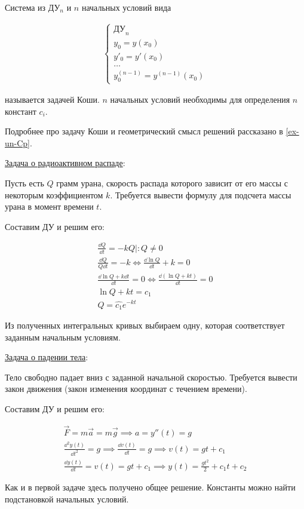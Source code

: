 \begin{definition}
  Система из ДУ\(_{n}\) и \(n\) начальных условий вида

  \begin{align*}
    \begin{cases}
      \text{ДУ}_n \\
      y_0 = y(x_0) \\
      y'_0 = y'(x_0) \\
      \dots \\
      y^{(n - 1)}_0 = y^{(n - 1)}(x_0)
    \end{cases}
  \end{align*}

  называется задачей Коши. \(n\) начальных условий необходимы для определения
  \(n\) констант \(c_{i}\).
\end{definition}

\begin{remark}
  Подробнее про задачу Коши и геометрический смысл решений рассказано в
  \ref{ex-un-Cp}.
\end{remark}

\underline{Задача о радиоактивном распаде}: 

Пусть есть \(Q\) грамм урана, скорость распада которого зависит от его массы с
некоторым коэффициентом \(k\). Требуется вывести формулу для подсчета массы
урана в момент времени \(t\).

Составим ДУ и решим его:

\begin{align*}
  \frac{\dd Q}{\dd t} = -k Q \mid \colon Q \neq 0
  \\
  \frac{\dd Q}{Q \dd t} = -k
  \iff
  \frac{\dd \ln Q}{\dd t} + k = 0
  \\
  \frac{\dd \ln Q + k \dd t}{\dd t} = 0
  \iff
  \frac{\dd (\ln Q + k t)}{\dd t} = 0
  \\
  \ln Q + kt = c_{1} \\
  Q = \widehat{c_{1}} e^{-k t}
\end{align*}

Из полученных интегральных кривых выбираем одну, которая соответствует
заданным начальным условиям.

\underline{Задача о падении тела}: 

Тело свободно падает вниз с заданной начальной скоростью. Требуется вывести
закон движения (закон изменения координат с течением времени).

Составим ДУ и решим его:

\begin{align*}
  \vec{F} = m \vec{a} = m \vec{g} \implies a = y''(t) = g \\
  \frac{\dd^{2} y(t)}{\dd t^{2}} = g
  \implies \frac{\dd v(t)}{\dd t} = g 
  \implies v(t) = g t + c_{1} \\
  \frac{\dd y(t)}{\dd t}  = v(t) = g t + c_{1}
  \implies y(t) = \frac{g t^{2}}{2} + c_{1} t + c_{2}
\end{align*}

Как и в первой задаче здесь получено общее решение. Константы можно найти
подстановкой начальных условий.
